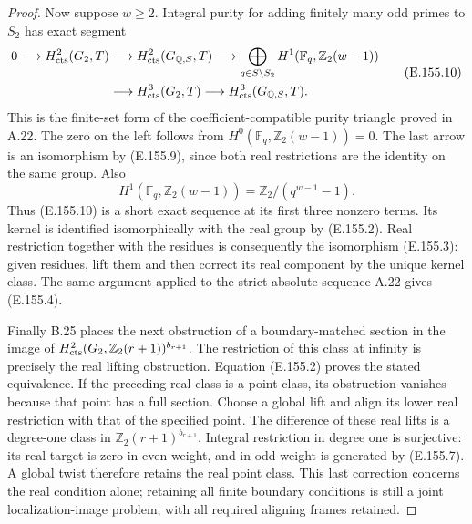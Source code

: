 \begin{proof}
Now suppose \(w\geq2\). Integral purity for adding finitely
many odd primes to \(S_2\) has exact segment
\[
 \begin{split}
 0\longrightarrow H^2_{\rm cts}(G_2,T)
 &\longrightarrow H^2_{\rm cts}(G_{\mathbb Q,S},T)
 \longrightarrow
   \bigoplus_{q\in S\setminus S_2}H^1(\mathbb F_q,\mathbb Z_2(w-1))\\
 &\longrightarrow H^3_{\rm cts}(G_2,T)
 \longrightarrow H^3_{\rm cts}(G_{\mathbb Q,S},T).
 \end{split}
 \tag{E.155.10}
\]
This is the finite-set form of the coefficient-compatible
purity triangle proved in A.22. The zero on the left follows
from \(H^0(\mathbb F_q,\mathbb Z_2(w-1))=0\).
The last arrow is an isomorphism by (E.155.9), since
both real restrictions are the identity on the same group.
Also
\[
 H^1(\mathbb F_q,\mathbb Z_2(w-1))
                  =\mathbb Z_2/(q^{w-1}-1).
 \]
Thus (E.155.10) is a short exact sequence at its first three
nonzero terms. Its kernel is identified isomorphically with
the real group by (E.155.2). Real restriction together with
the residues is consequently the isomorphism (E.155.3):
given residues, lift them and then correct its real component
by the unique kernel class. The same argument applied to
the strict absolute sequence A.22 gives (E.155.4).

Finally B.25 places the next obstruction of a boundary-matched
section in the image of
\(H^2_{\rm cts}(G_2,\mathbb Z_2(r+1))^{b_{r+1}}\).
The restriction of this class at infinity is precisely
the real lifting obstruction. Equation (E.155.2) proves
the stated equivalence. If the preceding real class is a
point class, its obstruction vanishes because that point
has a full section. Choose a global lift and align its
lower real restriction with that of the specified point.
The difference of these real lifts is a degree-one class
in \(\mathbb Z_2(r+1)^{b_{r+1}}\). Integral restriction in
degree one is surjective: its real target is zero in even
weight, and in odd weight is generated by (E.155.7).
A global twist therefore retains the real point class.
This last correction concerns the real condition alone;
retaining all finite boundary conditions is still a joint
localization-image problem, with all required aligning
frames retained.
\end{proof}


